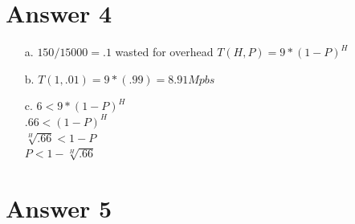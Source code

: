 \documentclass[11pt]{article}
\theoremstyle{definition}
\begin{document}
\section*{Answer 4}
\begin{enumerate}
	\item[a.] $150/15000 = .1$ wasted for overhead  
	$T(H,P) = 9 * (1 - P)^H$
	\item[b.] $T(1,.01) = 9 * (.99) = 8.91Mpbs$
	\item[c.] $6 < 9 * (1 - P)^H$\\
	$.66 < (1 - P)^H$\\
	$\sqrt[H]{.66} < 1 - P$\\
	$P < 1 - \sqrt[H]{.66}$
\end{enumerate}

\section*{Answer 5}
\end{document}
